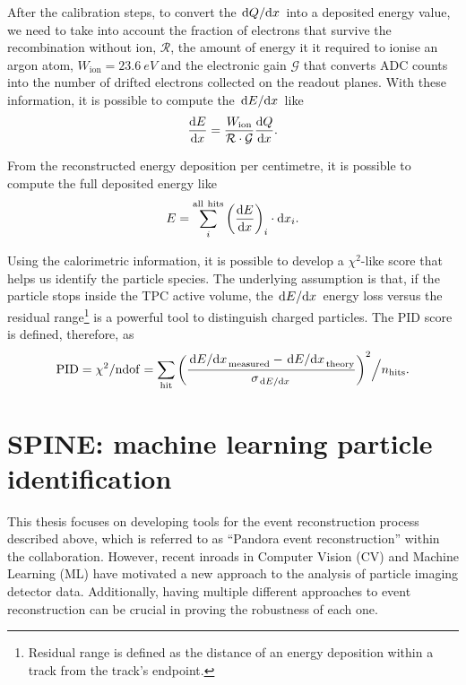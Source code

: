 After the calibration steps, to convert the $\dv*{Q}{x}$ into a deposited energy value, we need to take into account the fraction of electrons that survive the recombination without ion, $\mathcal{R}$, the amount of energy it it required to ionise an argon atom, $W_\mathrm{ion} = \SI{23.6}{eV}$ and the electronic gain $\mathcal{G}$ that converts ADC counts into the number of drifted electrons collected on the readout planes. With these information, it is possible to compute the $\dv*{E}{x}$ like \begin{equation}
    \dv{E}{x} = \frac{W_\mathrm{ion}}{\mathcal{R\cdot G}} \dv{Q}{x}. 
\end{equation}

From the reconstructed energy deposition per centimetre, it is possible to compute the full deposited energy like \begin{equation}
    E = \sum_i^\mathrm{all\ hits} \qty(\dv{E}{x} )_i \cdot \dd x_i. 
\end{equation}

Using the calorimetric information, it is possible to develop a $\chi^2$-like score that helps us identify the particle species. The underlying assumption is that, if the particle stops inside the TPC active volume, the $\dv*{E}{x}$ energy loss versus the residual range\footnote{Residual range is defined as the distance of an energy deposition within a track from the track's endpoint.} is a powerful tool to distinguish charged particles. The PID score is defined, therefore, as \cite{arteroponsStudyReconstructionNuMuCC} \begin{equation}
    \mathrm{PID} = \chi^2/\mathrm{ndof} = \sum_\mathrm{hit} \qty(\frac{{\dv*{E}{x}}_\mathrm{measured} - {\dv*{E}{x}}_\mathrm{theory}}{\sigma_{\dv*{E}{x}}})^2 \Big/ n_\mathrm{hits}. \label{eq:PID}
\end{equation}

\section{SPINE: machine learning particle identification} \label{sec:SPINE}

This thesis focuses on developing tools for the event reconstruction process described above, which is referred to as ``Pandora event reconstruction'' within the collaboration. However, recent inroads in Computer Vision (CV) and Machine Learning (ML) have motivated a new approach to the analysis of particle imaging detector data. Additionally, having multiple different approaches to event reconstruction can be crucial in proving the robustness of each one. 


